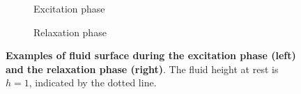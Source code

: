 \begin{figure}
\centering
\begin{subfigure}{0.45\textwidth}
	\centering
    	\caption{Excitation phase}
	\label{fig:sloshing_excitation}
\end{subfigure} \quad
\begin{subfigure}{0.45\textwidth}
	\centering
    	\caption{Relaxation phase}
	\label{fig:sloshing_free}
\end{subfigure}
\caption{\textbf{Examples of fluid surface during the excitation phase (left) and the relaxation phase (right)}. The fluid height at rest is $h=1$, indicated by the dotted line.}
\label{fig:sloshing_examples}
\end{figure} 

